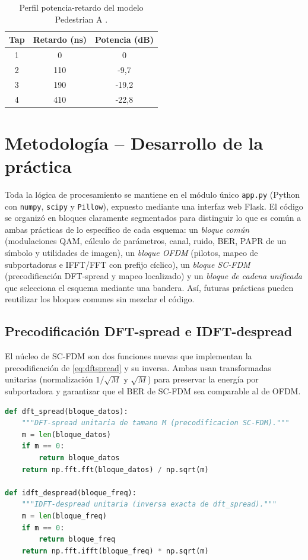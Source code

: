 \documentclass[conference,onecolumn]{IEEEtran}
\begin{document}
\begin{table}[H]
    \renewcommand{\arraystretch}{1.2}
    \caption{Perfil potencia-retardo del modelo Pedestrian A \cite{ituR1225}.}
    \label{tab:pedA}
    \centering
    \begin{tabular}{ccc}
        \hline
        \textbf{Tap} & \textbf{Retardo (ns)} & \textbf{Potencia (dB)} \\
        \hline
        1 & 0   & 0       \\
        2 & 110 & -9{,}7  \\
        3 & 190 & -19{,}2 \\
        4 & 410 & -22{,}8 \\
        \hline
    \end{tabular}
\end{table}

\section{Metodolog\'ia -- Desarrollo de la pr\'actica}

Toda la l\'ogica de procesamiento se mantiene en el m\'odulo \'unico \texttt{app.py} (Python con \texttt{numpy}, \texttt{scipy} y \texttt{Pillow}), expuesto mediante una interfaz web Flask. El c\'odigo se organiz\'o en bloques claramente segmentados para distinguir lo que es com\'un a ambas pr\'acticas de lo espec\'ifico de cada esquema: un \emph{bloque com\'un} (modulaciones QAM, c\'alculo de par\'ametros, canal, ruido, BER, PAPR de un s\'imbolo y utilidades de imagen), un \emph{bloque OFDM} (pilotos, mapeo de subportadoras e IFFT/FFT con prefijo c\'iclico), un \emph{bloque SC-FDM} (precodificaci\'on DFT-spread y mapeo localizado) y un \emph{bloque de cadena unificada} que selecciona el esquema mediante una bandera. As\'i, futuras pr\'acticas pueden reutilizar los bloques comunes sin mezclar el c\'odigo.

\subsection{Precodificaci\'on DFT-spread e IDFT-despread}

El n\'ucleo de SC-FDM son dos funciones nuevas que implementan la precodificaci\'on de \eqref{eq:dftspread} y su inversa. Ambas usan transformadas unitarias (normalizaci\'on $1/\sqrt{M}$ y $\sqrt{M}$) para preservar la energ\'ia por subportadora y garantizar que el BER de SC-FDM sea comparable al de OFDM.

\begin{lstlisting}[language=Python]
def dft_spread(bloque_datos):
    """DFT-spread unitaria de tamano M (precodificacion SC-FDM)."""
    m = len(bloque_datos)
    if m == 0:
        return bloque_datos
    return np.fft.fft(bloque_datos) / np.sqrt(m)

def idft_despread(bloque_freq):
    """IDFT-despread unitaria (inversa exacta de dft_spread)."""
    m = len(bloque_freq)
    if m == 0:
        return bloque_freq
    return np.fft.ifft(bloque_freq) * np.sqrt(m)
\end{lstlisting}
\end{document}
